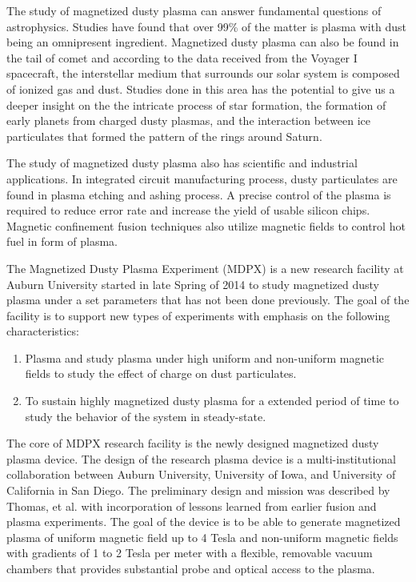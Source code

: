 The study of magnetized dusty plasma can answer fundamental questions of astrophysics. Studies have found that over 99\% of the matter is plasma with dust being an omnipresent ingredient\cite{shukla2010introduction}. Magnetized dusty plasma can also be found in the tail of comet\cite{niedner1978interplanetary} and according to the data received from the Voyager I spacecraft, the interstellar medium that surrounds our solar system is composed of ionized gas and dust\cite{website:Weiss2013voyager, website:Cook2013voyager, burke1983gas}. Studies done in this area has the potential to give us a deeper insight on the the intricate process of star formation\cite{mestel1956star}, the formation of early planets from charged dusty plasmas, and the interaction between ice particulates that formed the pattern of the rings around Saturn\cite{gurnett1983micron, goertz1983model}.

The study of magnetized dusty plasma also has scientific and industrial applications. In integrated circuit manufacturing process, dusty particulates are found in plasma etching and ashing process. A precise control of the plasma is required to reduce error rate and increase the yield of usable silicon chips. Magnetic confinement fusion techniques also utilize magnetic fields to control hot fuel in form of plasma.

The Magnetized Dusty Plasma Experiment (MDPX) is a new research facility at Auburn University started in late Spring of 2014 to study magnetized dusty plasma under a set parameters that has not been done previously. The goal of the facility is to support new types of experiments with emphasis on the following characteristics:

\begin{enumerate}
\item Plasma and study plasma under high uniform and non-uniform magnetic fields to study the effect of charge on dust particulates.
\item To sustain highly magnetized dusty plasma for a extended period of time to study the behavior of the system in steady-state.
\end{enumerate}

The core of MDPX research facility is the newly designed magnetized dusty plasma device. The design of the research plasma device is a multi-institutional collaboration between Auburn University, University of Iowa, and University of California in San Diego. The preliminary design and mission was described by Thomas, et al. with incorporation of lessons learned from earlier fusion and plasma experiments. The goal of the device is to be able to generate magnetized plasma of uniform magnetic field up to 4 Tesla and non-uniform magnetic fields with gradients of 1 to 2 Tesla per meter with a flexible, removable vacuum chambers that provides substantial probe and optical access to the plasma\cite{PLA:9579370}.

